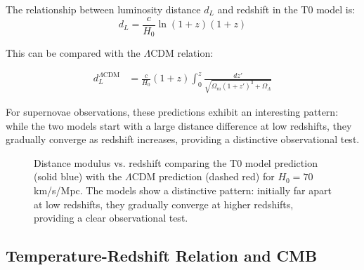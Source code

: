 \documentclass[12pt,a4paper]{article} %
\begin{document}
The relationship between luminosity distance $d_L$ and redshift
in the T0 model is:
\begin{equation}
	d_L = \frac{c}{H_0}\ln(1+z)(1+z)
	\label{eq:luminosity_distance}
\end{equation}

This can be compared with the $\Lambda$CDM relation:
\begin{tcolorbox}[width=\textwidth, colback=white, colframe=black, boxrule=0.5pt]
	\begin{align}
		d_L^{\text{$\Lambda$CDM}} &= \frac{c}{H_0}(1+z)
		\int_0^z \frac{dz'}{\sqrt{\Omega_m(1+z')^3 + \Omega_{\Lambda}}}
		\label{eq:luminosity_distance_lcdm}
	\end{align}
\end{tcolorbox}

For supernovae observations,
these predictions exhibit an interesting pattern:
while the two models start with a large distance difference at low redshifts,
they gradually converge as redshift increases,
providing a distinctive observational test.

\begin{figure}[ht]
	\centering
	\caption{Distance modulus vs. redshift
		comparing the T0 model prediction (solid blue)
		with the $\Lambda$CDM prediction (dashed red)
		for $H_0 = 70$ km/s/Mpc.
		The models show a distinctive pattern: initially far apart at low redshifts,
		they gradually converge at higher redshifts,
		providing a clear observational test.}
	\label{fig:distance_modulus}
\end{figure}
	\subsection{Temperature-Redshift Relation and CMB}
	\label{subsec:cmb_temp}
	
\end{document}
